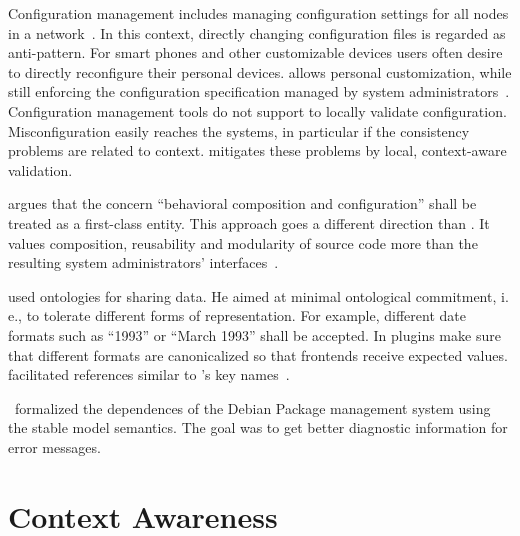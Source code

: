 Configuration management includes managing configuration settings for all nodes in a network~\cite{delaet2010short}.
In this context, directly changing configuration files is regarded as anti-pattern.
For smart phones and other customizable devices users often desire to directly reconfigure their personal devices.
 allows personal customization, while still enforcing the configuration specification managed by system administrators~\cite{raab2016improving}.
Configuration management tools do not support to locally validate configuration.
Misconfiguration easily reaches the systems, in particular if the consistency problems are related to context.
\elektra{} mitigates these problems by local, context-aware validation.

\citet{zdun2006tailorable} argues that the concern \enquote{behavioral composition and configuration} shall be treated as a first-class entity.
This approach goes a different direction than \elektra{}.
It values composition, reusability and modularity of source code more than the resulting system administrators' interfaces~\cite{raab2015kps}.

\citet{gruber1995ontologies} used ontologies for sharing data.
He aimed at minimal ontological commitment, i.\,e., to tolerate different forms of representation.
For example, different date formats such as ``1993'' or ``March 1993'' shall be accepted.
In \elektra{} plugins make sure that different formats are canonicalized so that frontends receive expected values.
\citet{gruber1995ontologies} facilitated references similar to \elektra{}'s key names~\cite{raab2015kps}.


\citet{syrjanen2000including}~formalized the dependences of the Debian Package management system using the stable model semantics.
The goal was to get better diagnostic information for error messages.


































\section{Context Awareness}
\label{sec:related-awareness}

